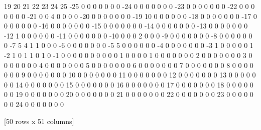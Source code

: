 \documentclass[letterpaper,10pt,english]{sphinxmanual}
\begin{document}
{\begin{sphinxVerbatim}[commandchars=\\\{\}]
      19   20   21   22   23   24   25
-25    0    0    0    0    0    0    0
-24    0    0    0    0    0    0    0
-23    0    0    0    0    0    0    0
-22    0    0    0    0    0    0    0
-21    0    0    4    0    0    0    0
-20    0    0    0    0    0    0    0
-19   10    0    0    0    0    0    0
-18    0    0    0    0    0    0    0
-17    0    0    0    0    0    0    0
-16    0    0    0    0    0    0    0
-15    0    0    0    0    0    0    0
-14    0    0    0    0    0    0    0
-13    0    0    0    0    0    0    0
-12    1    0    0    0    0    0    0
-11    0    0    0    0    0    0    0
-10    0    0    0    2    0    0    0
-9     0    0    0    0    0    0    0
-8     0    0    0    0    0    0    0
-7     5    4    1    1    0    0    0
-6     0    0    0    0    0    0    0
-5     5    0    0    0    0    0    0
-4     0    0    0    0    0    0    0
-3     1    0    0    0    0    0    1
-2     1    0    1    1    0    1    0
-1     0    0    0    0    0    0    0
 0     0    0    1    0    0    0    0
 1     0    0    0    0    0    0    0
 2     0    0    0    0    0    0    0
 3     0    0    0    0    0    0    0
 4     0    0    0    0    0    0    0
 5     0    0    0    0    0    0    0
 6     0    0    0    0    0    0    0
 7     0    0    0    0    0    0    0
 8     0    0    0    0    0    0    0
 9     0    0    0    0    0    0    0
 10    0    0    0    0    0    0    0
 11    0    0    0    0    0    0    0
 12    0    0    0    0    0    0    0
 13    0    0    0    0    0    0    0
 14    0    0    0    0    0    0    0
 15    0    0    0    0    0    0    0
 16    0    0    0    0    0    0    0
 17    0    0    0    0    0    0    0
 18    0    0    0    0    0    0    0
 19    0    0    0    0    0    0    0
 20    0    0    0    0    0    0    0
 21    0    0    0    0    0    0    0
 22    0    0    0    0    0    0    0
 23    0    0    0    0    0    0    0
 24    0    0    0    0    0    0    0

[50 rows x 51 columns]
\end{sphinxVerbatim}
}
\end{document}

